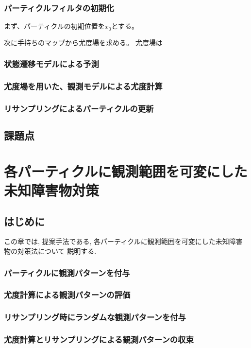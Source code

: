 \subsection{パーティクルフィルタの初期化}

まず、パーティクルの初期位置を$x_0$とする。


次に手持ちのマップから尤度場を求める。
尤度場は


\subsection{状態遷移モデルによる予測}

\subsection{尤度場を用いた、観測モデルによる尤度計算}

\subsection{リサンプリングによるパーティクルの更新}

\section{課題点}


\chapter{各パーティクルに観測範囲を可変にした未知障害物対策}
\section{はじめに}
この章では, 提案手法である, 各パーティクルに観測範囲を可変にした未知障害物の対策法について
説明する. 

\subsection{パーティクルに観測パターンを付与}
\subsection{尤度計算による観測パターンの評価}
\subsection{リサンプリング時にランダムな観測パターンを付与}
\subsection{尤度計算とリサンプリングによる観測パターンの収束}


